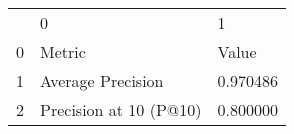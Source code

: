 \begin{tabular}{lll}
 & 0 & 1 \\
0 & Metric & Value \\
1 & Average Precision & 0.970486 \\
2 & Precision at 10 (P@10) & 0.800000 \\
\end{tabular}
